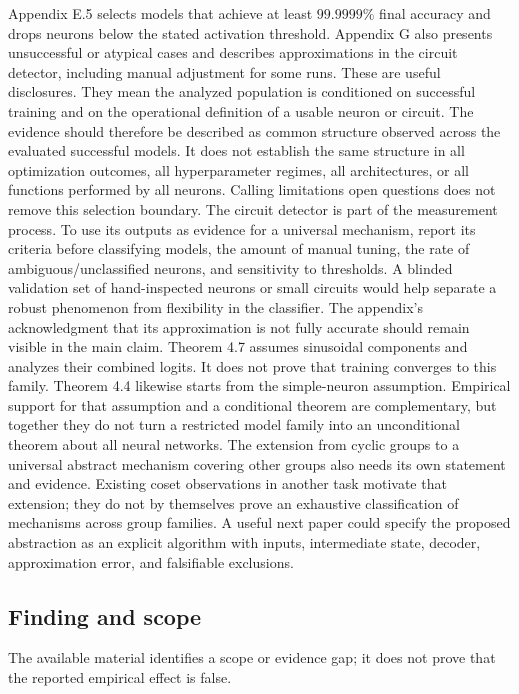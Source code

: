 \documentclass[11pt]{article}
\begin{document}
Appendix E.5 selects models that achieve at least \(99.9999\%\) final accuracy and drops neurons below the stated activation threshold. Appendix G also presents unsuccessful or atypical cases and describes approximations in the circuit detector, including manual adjustment for some runs. These are useful disclosures. They mean the analyzed population is conditioned on successful training and on the operational definition of a usable neuron or circuit. The evidence should therefore be described as common structure observed across the evaluated successful models. It does not establish the same structure in all optimization outcomes, all hyperparameter regimes, all architectures, or all functions performed by all neurons. Calling limitations open questions does not remove this selection boundary. The circuit detector is part of the measurement process. To use its outputs as evidence for a universal mechanism, report its criteria before classifying models, the amount of manual tuning, the rate of ambiguous/unclassified neurons, and sensitivity to thresholds. A blinded validation set of hand-inspected neurons or small circuits would help separate a robust phenomenon from flexibility in the classifier. The appendix's acknowledgment that its approximation is not fully accurate should remain visible in the main claim. Theorem 4.7 assumes sinusoidal components and analyzes their combined logits. It does not prove that training converges to this family. Theorem 4.4 likewise starts from the simple-neuron assumption. Empirical support for that assumption and a conditional theorem are complementary, but together they do not turn a restricted model family into an unconditional theorem about all neural networks. The extension from cyclic groups to a universal abstract mechanism covering other groups also needs its own statement and evidence. Existing coset observations in another task motivate that extension; they do not by themselves prove an exhaustive classification of mechanisms across group families. A useful next paper could specify the proposed abstraction as an explicit algorithm with inputs, intermediate state, decoder, approximation error, and falsifiable exclusions.

\subsection*{Finding and scope}

The available material identifies a scope or evidence gap; it does not prove that the reported empirical effect is false.
\end{document}
